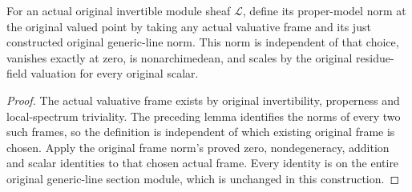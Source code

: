 \begin{definition}
\label{def:scheme-line-actual-model-norm}
\leanok
{}
For an actual original invertible module sheaf $\mathcal L$, define
its proper-model norm at the original valued point by taking any
actual valuative frame and its just constructed original generic-line
norm. This norm is independent of that choice, vanishes exactly at
zero, is nonarchimedean, and scales by the original residue-field
valuation for every original scalar.
\end{definition}
\begin{proof}
The actual valuative frame exists by original invertibility, properness
and local-spectrum triviality. The preceding lemma identifies the
norms of every two such frames, so the definition is independent of
which existing original frame is chosen. Apply the original frame
norm's proved zero, nondegeneracy, addition and scalar identities to
that chosen actual frame. Every identity is on the entire original
generic-line section module, which is unchanged in this construction.
\end{proof}
